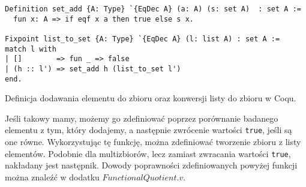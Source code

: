 \begin{code}
\begin{verbatim}
Definition set_add {A: Type} `{EqDec A} (a: A) (s: set A)  : set A :=
  fun x: A => if eqf x a then true else s x.

Fixpoint list_to_set {A: Type} `{EqDec A} (l: list A) : set A :=
match l with
| []        => fun _ => false
| (h :: l') => set_add h (list_to_set l')
end.
\end{verbatim}
\caption{Definicja dodawania elementu do zbioru oraz konwersji listy do zbioru w Coqu.}
\label{set_union}
\end{code}
Jeśli takowy mamy, możemy go zdefiniować poprzez porównanie badanego elementu z tym, który dodajemy, a następnie zwrócenie wartości \texttt{true}, jeśli są one równe. Wykorzystując tę funkcję, można zdefiniować tworzenie zbioru z listy elementów. Podobnie dla multizbiorów, lecz zamiast zwracania wartości \texttt{true}, nakładany jest następnik. Dowody poprawności zdefiniowanych powyżej funkcji można znaleźć w dodatku $FunctionalQuotient.v$.
